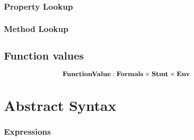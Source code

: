 \documentclass{article}
\begin{document}
\subsubsection{Property Lookup}
\label{subsubsec:property-lookup}

\subsubsection{Method Lookup}
\label{subsubsec:method-lookup}

\subsection{Function values}
\label{subsec:function-values}
\[
	\mathbf{FunctionValue} : \mathbf{Formals} \times \mathbf{Stmt} \times \mathbf{Env}
\]

\section{Abstract Syntax}
\label{sec:abstract-syntax}

\subsubsection{Expressions}
\label{sec:expr-syntax}

\newcommand{\VariableGet}[1]{#1}
\newcommand{\VariableSet}[2]{#1=#2}

\newcommand{\PropertyGet}[2]{#1.#2}
\newcommand{\PropertySet}[3]{#1.#2=#3}

\newcommand{\DirectPropertyGet}[2]{#1.\{#2\}}
\newcommand{\DirectPropertySet}[3]{#1.\{#2\}=#3}

\newcommand{\SuperPropertyGet}[1]{\tt{super}.#1}
\newcommand{\SuperPropertySet}[2]{\tt{super}.#1=#2}

\newcommand{\StaticGet}[1]{#1}
\newcommand{\StaticSet}[2]{#1=#2}

\newcommand{\InstanceMethodInvocation}[3]{#1.#2(#3)}
\newcommand{\DInstanceMethodInvocation}[3]{#1.\{#2\}(#3)}
\newcommand{\SuperMethodInvocation}[2]{\tt{super}.#1(#2)}
\newcommand{\StaticInvocation}[2]{#1(#2)}

\newcommand{\Not}[1]{!#1}
\newcommand{\AndExpression}[2]{#1\,\&\&\,#2}
\newcommand{\OrExpression}[2]{#1\,||\,#2}
\newcommand{\ConditionalExpression}[3]{#1\,?\,#2\,:\,#3}
\end{document}
